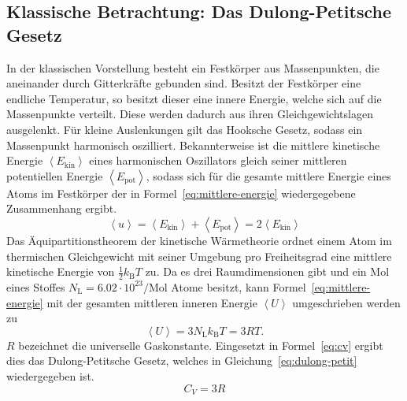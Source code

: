 \subsection{Klassische Betrachtung: Das Dulong-Petitsche Gesetz}
In der klassischen Vorstellung besteht ein Festkörper aus Massenpunkten, 
die aneinander durch Gitterkräfte gebunden sind. Besitzt der Festkörper 
eine endliche Temperatur, so besitzt dieser eine innere Energie, welche 
sich auf die Massenpunkte verteilt. Diese werden dadurch aus ihren 
Gleichgewichtslagen ausgelenkt. Für kleine Auslenkungen gilt das 
Hooksche Gesetz, sodass ein Massenpunkt harmonisch oszilliert. 
Bekannterweise ist die mittlere kinetische Energie $\left<E_\text{kin}\right>$ 
eines harmonischen Oszillators gleich seiner mittleren potentiellen Energie
$\left<E_\text{pot}\right>$, sodass sich für die gesamte mittlere 
Energie eines Atoms im Festkörper der in Formel~\eqref{eq:mittlere-energie} 
wiedergegebene Zusammenhang ergibt.
%
\begin{equation}
\label{eq:mittlere-energie}
\left<u\right> = \left<E_\text{kin}\right> + \left<E_\text{pot}\right> = 2\left<E_\text{kin}\right>
\end{equation}
%
Das Äquipartitionstheorem der kinetische Wärmetheorie ordnet einem Atom 
im thermischen Gleichgewicht mit seiner Umgebung pro Freiheitsgrad eine 
mittlere kinetische Energie von $\frac{1}{2}k_\text{B}T$ zu. 
Da es drei Raumdimensionen gibt und ein Mol eines Stoffes 
$N_\text{L} = 6.02\cdot10^{23} /\text{Mol}$ Atome besitzt, kann 
Formel~\eqref{eq:mittlere-energie} mit der gesamten mittleren inneren Energie 
$\left<U\right>$ umgeschrieben werden zu
%
\begin{equation}
\left<U\right> = 3 N_\text{L} k_\text{B} T = 3RT .
\end{equation}
%
$R$ bezeichnet die universelle Gaskonstante.
Eingesetzt in Formel~\eqref{eq:cv} ergibt dies das Dulong-Petitsche 
Gesetz, welches in Gleichung~\eqref{eq:dulong-petit} wiedergegeben ist.
%
\begin{equation}
\label{eq:dulong-petit}
C_V = 3R
\end{equation}
%

